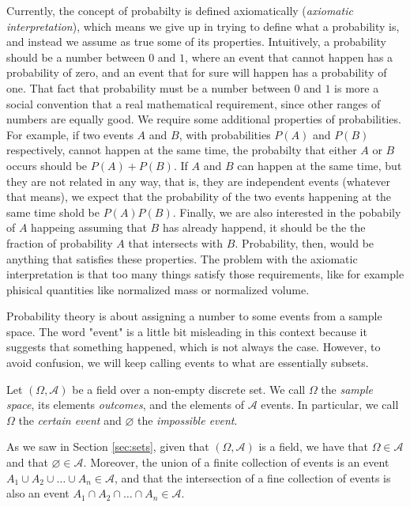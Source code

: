 Currently, the concept of probabilty is defined axiomatically (\emph{axiomatic interpretation}), which means we give up in trying to define what a probability is, and instead we assume as true some of its properties. Intuitively, a probability should be a number between $0$ and $1$, where an event that cannot happen has a probability of zero, and an event that for sure will happen has a probability of one. That fact that probability must be a number between $0$ and $1$ is more a social convention that a real mathematical requirement, since other ranges of numbers are equally good. We require some additional properties of probabilities. For example, if two events $A$ and $B$, with probabilities $P \left( A \right)$ and $P \left( B \right)$ respectively, cannot happen at the same time, the probabilty that either $A$ or $B$ occurs should be $P \left( A \right) + P \left( B \right)$. If $A$ and $B$ can happen at the same time, but they are not related in any way, that is, they are independent events (whatever that means), we expect that the probability of the two events happening at the same time shold be $P \left( A \right) P \left( B \right)$. Finally, we are also interested in the pobabily of $A$ happeing assuming that $B$ has already happend, it should be the the fraction of probability $A$ that intersects with $B$. Probability, then, would be anything that satisfies these properties. The problem with the axiomatic interpretation is that too many things satisfy those requirements, like for example phisical quantities like normalized mass or normalized volume.

Probability theory is about assigning a number to some events from a sample space. The word "event" is a little bit misleading in this context because it suggests that something happened, which is not always the case. However, to avoid confusion, we will keep calling events to what are essentially subsets.

\begin{definition}
Let $\left( \Omega, \mathcal{A} \right)$ be a field over a non-empty discrete set. We call $\Omega$ the \emph{sample space}, its elements \emph{outcomes}, and the elements of $\mathcal{A}$ events. In particular, we call $\Omega$ the \emph{certain event} and $\varnothing$ the \emph{impossible event}.
\end{definition}

As we saw in Section \ref{sec:sets}, given that $\left( \Omega, \mathcal{A} \right)$ is a field, we have that $\Omega \in \mathcal{A}$ and that $\varnothing \in \mathcal{A}$. Moreover, the union of a finite collection of events is an event $A_1 \cup A_2 \cup \ldots \cup A_n \in \mathcal{A}$, and that the intersection of a fine collection of events is also an event $A_1 \cap A_2 \cap \ldots \cap A_n \in \mathcal{A}$.

